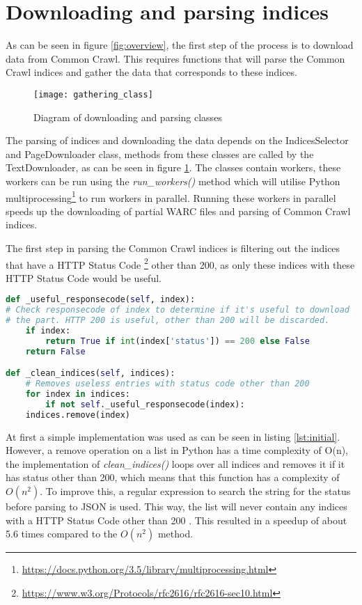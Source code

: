 \section{Downloading and parsing indices}

As can be seen in figure \ref{fig:overview}, the first step of the process is to download data from Common Crawl. This requires functions that will parse the Common Crawl indices and gather the data that corresponds to these indices. 

\begin{figure}[H]
\centering
\texttt{[image: gathering\_class]}
\caption{Diagram of downloading and parsing classes}
\label{fig:gathering_class}
\end{figure}

The parsing of indices and downloading the data depends on the IndicesSelector and PageDownloader class, methods from these classes are called by the TextDownloader, as can be seen in figure \ref{fig:gathering_class}. The classes contain workers, these workers can be run  using the \textit{run\_workers()} method which will utilise Python multiprocessing\footnote{\url{https://docs.python.org/3.5/library/multiprocessing.html}} to run workers in parallel. Running these workers in parallel speeds up the downloading of partial WARC files and parsing of Common Crawl indices.

The first step in parsing the Common Crawl indices is filtering out the indices that have a HTTP Status Code \footnote{\url{https://www.w3.org/Protocols/rfc2616/rfc2616-sec10.html}} other than 200, as only these indices with these HTTP Status Code would be useful. 

\begin{lstlisting}[language=Python, caption=Initial implementation, label={lst:initial}]
def _useful_responsecode(self, index):
# Check responsecode of index to determine if it's useful to download
# the part. HTTP 200 is useful, other than 200 will be discarded.
    if index:
        return True if int(index['status']) == 200 else False
    return False

def _clean_indices(self, indices):
    # Removes useless entries with status code other than 200
    for index in indices:
        if not self._useful_responsecode(index):
    indices.remove(index)
\end{lstlisting}

At first a simple implementation was used as can be seen in listing \ref{lst:initial}. However, a remove operation on a list in Python has a time complexity of O(n), the implementation of \textit{clean\_indices()} loops over all indices and removes it if it has status other than 200, which means that this function has a complexity of $O(n^2)$. To improve this, a regular expression to search the string for the status before parsing to JSON is used. This way, the list will never contain any indices with a HTTP Status Code other than 200 . This resulted in a speedup of about 5.6 times compared to the $O(n^2)$ method.


